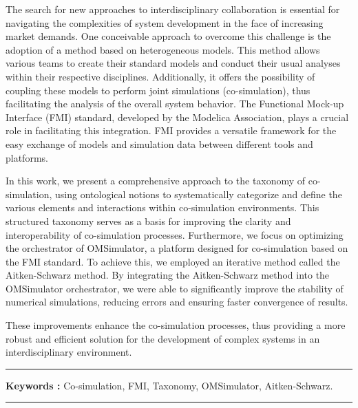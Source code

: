 \clearpage



The search for new approaches to interdisciplinary collaboration is essential for navigating the complexities of system development in the face of increasing market demands. One conceivable approach to overcome this challenge is the adoption of a method based on heterogeneous models. This method allows various teams to create their standard models and conduct their usual analyses within their respective disciplines. Additionally, it offers the possibility of coupling these models to perform joint simulations (co-simulation), thus facilitating the analysis of the overall system behavior. The Functional Mock-up Interface (FMI) standard, developed by the Modelica Association, plays a crucial role in facilitating this integration. FMI provides a versatile framework for the easy exchange of models and simulation data between different tools and platforms.
\medskip

In this work, we present a comprehensive approach to the taxonomy of co-simulation, using ontological notions to systematically categorize and define the various elements and interactions within co-simulation environments. This structured taxonomy serves as a basis for improving the clarity and interoperability of co-simulation processes. Furthermore, we focus on optimizing the orchestrator of OMSimulator, a platform designed for co-simulation based on the FMI standard. To achieve this, we employed an iterative method called the Aitken-Schwarz method. By integrating the Aitken-Schwarz method into the OMSimulator orchestrator, we were able to significantly improve the stability of numerical simulations, reducing errors and ensuring faster convergence of results.
\medskip

These improvements enhance the co-simulation processes, thus providing a more robust and efficient solution for the development of complex systems in an interdisciplinary environment.
\medskip

\vspace{1cm}



\noindent\rule[2pt]{\textwidth}{0.5pt}

{\textbf{Keywords :}}
Co-simulation, FMI, Taxonomy, OMSimulator, Aitken-Schwarz.
\\
\noindent\rule[2pt]{\textwidth}{0.5pt}


